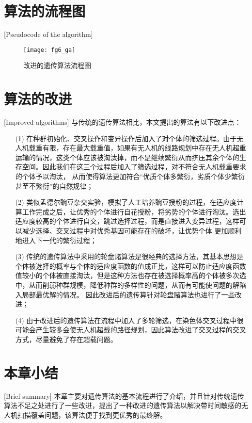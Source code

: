 \section{算法的流程图}[Pseudocode of the algorithm]
\begin{figure}[H]
	\centering
	\texttt{[image: fg6\_ga]}
	\caption{改进的遗传算法流程图}
	\label{fg403}
\end{figure}


\section{算法的改进}[Improved algorithms]
与传统的遗传算法相比，本文提出的算法有以下改进点：
\begin{itemize}
	\item [(1)] 在种群初始化、交叉操作和变异操作后加入了对个体的筛选过程。由于无人机载重有限，存在最大载重值，如果有无人机的线路规划中存在无人机超重运输的情况，这类个体应该被淘汰掉，而不是继续繁衍从而挤压其余个体的生存空间。因此我们在这三个过程后加入了筛选过程，对不符合无人机载重要求的个体予以淘汰，
从而使得算法更加符合“优质个体多繁衍，劣质个体少繁衍甚至不繁衍”的自然规律；
	\item [(2)] 类似孟德尔豌豆杂交实验，模拟了人工培养豌豆授粉的过程，在适应度计算工作完成之后，让优秀的个体进行自花授粉，将劣势的个体进行淘汰。选出适应度较高的个体进行自交，跳过选择过程，而是直接进入变异过程，这样可以减少选择、交叉过程中对优秀基因可能存在的破坏，让优势个体
更加顺利地进入下一代的繁衍过程；
	\item [(3)] 传统的遗传算法中采用的轮盘赌算法是很经典的选择方法，其基本思想是个体被选择的概率与个体的适应度函数的值成正比，这样可以防止适应度函数值较小的个体被直接淘汰，但是这种方法也存在被选择概率高的个体被多次选中，从而削弱种群规模，降低种群的多样性的问题，从而有可能使问题的解陷入局部最优解的情况。
因此改进后的遗传算针对轮盘赌算法也进行了一些改进；
	\item [(4)] 由于改进后的遗传算法在流程中加入了多轮筛选，在染色体交叉过程中很可能会产生较多会使无人机超载的路径规划，因此算法改进了交叉过程的交叉方式，尽量避免了存在超载问题。
\end{itemize}
\section{本章小结}[Brief summary]
本章主要对遗传算法的基本流程进行了介绍，并且针对传统遗传算法不足之处进行了一些改进，提出了一种改进的遗传算法以解决带时间敏感的无人机扫描覆盖问题，该算法便于找到更优秀的最终解。